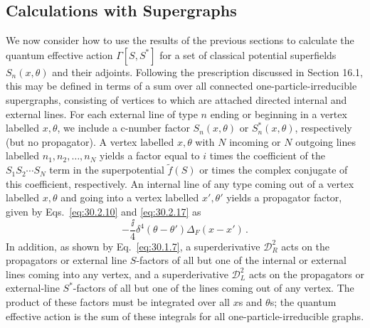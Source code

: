 
\providecommand{\SuperD}{\mathcal{D}}

\subsection{Calculations with Supergraphs}

We now consider how to use the results of the previous sections to calculate
the quantum effective action \(\Gamma[S,S^*]\) for a set of classical
potential superfields \(S_n(x,\theta)\) and their adjoints. Following the
prescription discussed in Section 16.1, this may be defined in terms of a sum
over all connected one-particle-irreducible supergraphs, consisting of
vertices to which are attached directed internal and external lines. For each
external line of type \(n\) ending or beginning in a vertex labelled
\(x,\theta\), we include a c-number factor \(S_n(x,\theta)\) or
\(S_n^*(x,\theta)\), respectively (but no propagator). A vertex labelled
\(x,\theta\) with \(N\) incoming or \(N\) outgoing lines labelled
\(n_1,n_2,\ldots,n_N\) yields a factor equal to \(i\) times the coefficient
of the \(S_1S_2\cdots S_N\) term in the superpotential \(\widetilde f(S)\) or
times the complex conjugate of this coefficient, respectively. An internal
line of any type coming out of a vertex labelled \(x,\theta\) and going into a
vertex labelled \(x',\theta'\) yields a propagator factor, given by
Eqs.~\eqref{eq:30.2.10} and \eqref{eq:30.2.17} as
\begin{equation}
  -\frac{\ii}{4}\delta^4(\theta-\theta')\Delta_F(x-x')\,.
  \tag{30.3.1}\label{eq:30.3.1}
\end{equation}
In addition, as shown by Eq.~\eqref{eq:30.1.7}, a superderivative
\(\SuperD_R^2\) acts on the propagators or external line \(S\)-factors of all
but one of the internal or external lines coming into any vertex, and a
superderivative \(\SuperD_L^2\) acts on the propagators or external-line
\(S^*\)-factors of all but one of the lines coming out of any vertex. The
product of these factors must be integrated over all \(x\)s and \(\theta\)s;
the quantum effective action is the sum of these integrals for all
one-particle-irreducible graphs.

